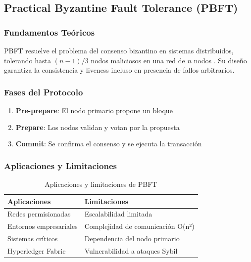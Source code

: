 \documentclass[spanish,12pt,letterpaper]{report}
\begin{document}
\subsection{Practical Byzantine Fault Tolerance (PBFT)}

\subsubsection{Fundamentos Teóricos}

PBFT resuelve el problema del consenso bizantino en sistemas distribuidos, tolerando hasta $(n-1)/3$ nodos maliciosos en una red de $n$ nodos \cite{castro1999practical}. Su diseño garantiza la consistencia y liveness incluso en presencia de fallos arbitrarios.

\subsubsection{Fases del Protocolo}

\begin{enumerate}
    \item \textbf{Pre-prepare}: El nodo primario propone un bloque
    \item \textbf{Prepare}: Los nodos validan y votan por la propuesta
    \item \textbf{Commit}: Se confirma el consenso y se ejecuta la transacción
\end{enumerate}

\subsubsection{Aplicaciones y Limitaciones}

\begin{table}[h]
\centering
\begin{tabular}{|p{6cm}|p{6cm}|}
\hline
\textbf{Aplicaciones} & \textbf{Limitaciones} \\
\hline
Redes permisionadas & Escalabilidad limitada \\
Entornos empresariales & Complejidad de comunicación O(n²) \\
Sistemas críticos & Dependencia del nodo primario \\
Hyperledger Fabric & Vulnerabilidad a ataques Sybil \\
\hline
\end{tabular}
\caption{Aplicaciones y limitaciones de PBFT}
\label{tab:pbft-comparison}
\end{table}
\end{document}
